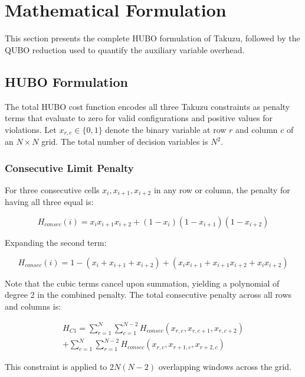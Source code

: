 \documentclass[eng]{ajceam-class}
\begin{document}
\section{Mathematical Formulation}

This section presents the complete HUBO formulation of Takuzu, followed by the QUBO reduction used to quantify the auxiliary variable overhead.

\subsection{HUBO Formulation}

The total HUBO cost function encodes all three Takuzu constraints as penalty terms that evaluate to zero for valid configurations and positive values for violations. Let $x_{r,c} \in \{0, 1\}$ denote the binary variable at row $r$ and column $c$ of an $N \times N$ grid. The total number of decision variables is $N^2$.

\subsubsection{Consecutive Limit Penalty}

For three consecutive cells $x_i, x_{i+1}, x_{i+2}$ in any row or column, the penalty for having all three equal is:

\begin{equation} \label{eq:penalty_consec}
 H_{consec}(i) = x_i x_{i+1} x_{i+2} + (1 - x_i)(1 - x_{i+1})(1 - x_{i+2})
\end{equation}

Expanding the second term:

\begin{equation} \label{eq:penalty_expanded}
 H_{consec}(i) = 1 - (x_i + x_{i+1} + x_{i+2}) + (x_i x_{i+1} + x_{i+1} x_{i+2} + x_i x_{i+2})
\end{equation}

Note that the cubic terms cancel upon summation, yielding a polynomial of degree 2 in the combined penalty. The total consecutive penalty across all rows and columns is:

\begin{multline}
 H_{C1} = \sum_{r=1}^{N} \sum_{c=1}^{N-2} H_{consec}(x_{r,c}, x_{r,c+1}, x_{r,c+2}) \\
 + \sum_{c=1}^{N} \sum_{r=1}^{N-2} H_{consec}(x_{r,c}, x_{r+1,c}, x_{r+2,c})
\end{multline}

This constraint is applied to $2N(N-2)$ overlapping windows across the grid.
\end{document}
